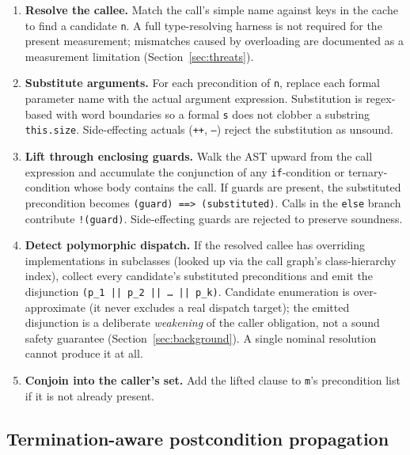 \begin{enumerate}\setlength\itemsep{0.2em}
  \item \textbf{Resolve the callee.} Match the call's simple name
        against keys in the cache to find a candidate \texttt{n}. A
        full type-resolving harness is not required for the present
        measurement; mismatches caused by overloading are documented
        as a measurement limitation (Section~\ref{sec:threats}).
  \item \textbf{Substitute arguments.} For each precondition of
        \texttt{n}, replace each formal parameter name with the actual
        argument expression. Substitution is regex-based with word
        boundaries so a formal \texttt{s} does not clobber a substring
        \texttt{this.size}. Side-effecting actuals
        (\texttt{++}, \texttt{--}) reject the substitution as unsound.
  \item \textbf{Lift through enclosing guards.} Walk the AST upward
        from the call expression and accumulate the conjunction of
        any \texttt{if}-condition or ternary-condition whose body
        contains the call. If guards are present, the substituted
        precondition becomes \texttt{(guard) ==> (substituted)}.
        Calls in the \texttt{else} branch contribute \texttt{!(guard)}.
        Side-effecting guards are rejected to preserve soundness.
  \item \textbf{Detect polymorphic dispatch.} If the resolved callee
        has overriding implementations in subclasses (looked up via
        the call graph's class-hierarchy index), collect every
        candidate's substituted preconditions and emit the disjunction
        \texttt{(p\_1 || p\_2 || \dots\ || p\_k)}. Candidate
        enumeration is over-approximate (it never excludes a real
        dispatch target); the emitted disjunction is a deliberate
        \emph{weakening} of the caller obligation, not a sound safety
        guarantee (Section~\ref{sec:background}). A single nominal
        resolution cannot produce it at all.
  \item \textbf{Conjoin into the caller's set.} Add the lifted clause
        to \texttt{m}'s precondition list if it is not already
        present.
\end{enumerate}

\subsection{Termination-aware postcondition propagation}

